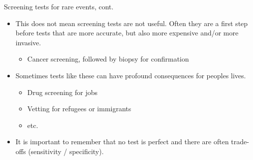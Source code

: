 \documentclass[xcolor=table, handout]{beamer}
\begin{document}
\begin{frame}{Screening tests for rare events, cont.}
\begin{block}{}
\begin{itemize}
\item This does not mean screening tests are not useful. Often they are a first step before tests that are more accurate, but also more expensive and/or more invasive.
\begin{itemize}
\item Cancer screening, followed by biopsy for confirmation
\end{itemize}

\pause
\item Sometimes tests like these can have profound consequences for peoples lives.
\begin{itemize}
\item Drug screening for jobs
\item Vetting for refugees or immigrants 
\item etc.
\end{itemize}

\pause
\item It is important to remember that no test is perfect and there are often trade-offs (sensitivity / specificity).
\end{itemize}
\end{block}
\end{frame}
\end{document}
